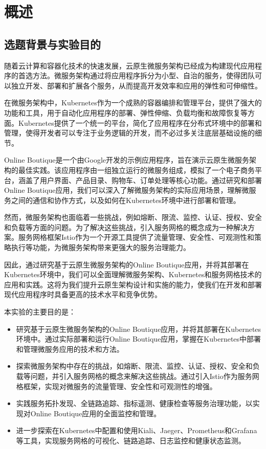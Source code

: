\chapter{概述}

\section{选题背景与实验目的}
随着云计算和容器化技术的快速发展，云原生微服务架构已经成为构建现代应用程序的首选方法。微服务架构通过将应用程序拆分为小型、自治的服务，使得团队可以独立开发、部署和扩展各个服务，从而提高开发效率和应用的弹性和可伸缩性。

在微服务架构中，Kubernetes作为一个成熟的容器编排和管理平台，提供了强大的功能和工具，用于自动化应用程序的部署、弹性伸缩、负载均衡和故障恢复等方面。Kubernetes提供了一个统一的平台，简化了应用程序在分布式环境中的部署和管理，使得开发者可以专注于业务逻辑的开发，而不必过多关注底层基础设施的细节。

Online Boutique是一个由Google开发的示例应用程序，旨在演示云原生微服务架构的最佳实践。该应用程序由一组独立运行的微服务组成，模拟了一个电子商务平台，涵盖了用户界面、产品目录、购物车、订单处理等核心功能。通过研究和部署Online Boutique应用，我们可以深入了解微服务架构的实际应用场景，理解微服务之间的通信和协作方式，以及如何在Kubernetes环境中进行部署和管理。

然而，微服务架构也面临着一些挑战，例如熔断、限流、监控、认证、授权、安全和负载等方面的问题。为了解决这些挑战，引入服务网格的概念成为一种解决方案。服务网格框架Istio作为一个开源工具提供了流量管理、安全性、可观测性和策略执行等功能，为微服务架构带来更强大的服务治理能力。

因此，通过研究基于云原生微服务架构的Online Boutique应用，并将其部署在Kubernetes环境中，我们可以全面理解微服务架构、Kubernetes和服务网格技术的应用和实践。这将为我们提升云原生架构设计和实施的能力，使我们在开发和部署现代应用程序时具备更高的技术水平和竞争优势。

本实验的主要目的是：

\begin{itemize}
	\item 研究基于云原生微服务架构的Online Boutique应用，并将其部署在Kubernetes环境中。通过实际部署和运行Online Boutique应用，掌握在Kubernetes中部署和管理微服务应用的技术和方法。
	\item 探索微服务架构中存在的挑战，如熔断、限流、监控、认证、授权、安全和负载等问题，并引入服务网格的概念来解决这些挑战。通过引入Istio作为服务网格框架，实现对微服务的流量管理、安全性和可观测性的增强。
	\item 实践服务拓扑发现、全链路追踪、指标遥测、健康检查等服务治理功能，以实现对Online Boutique应用的全面监控和管理。
	\item 进一步探索在Kubernetes中配置和使用Kiali、Jaeger、Prometheus和Grafana等工具，实现服务网格的可视化、链路追踪、日志监控和健康状态监测。
\end{itemize}

